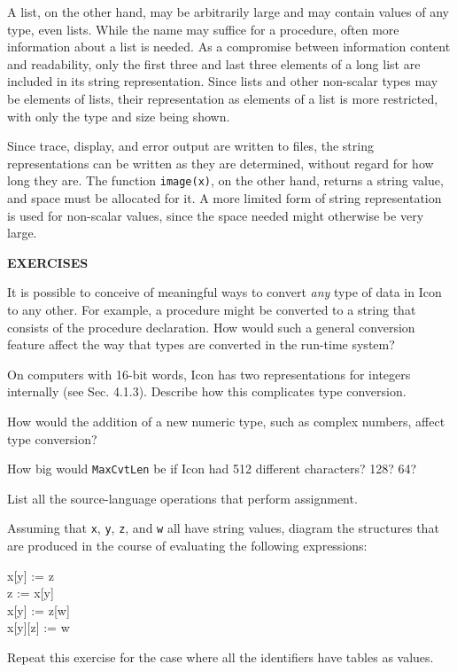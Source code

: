 A list, on the other hand, may be arbitrarily large and may contain
values of any type, even lists. While the name may suffice for a
procedure, often more information about a list is needed. As a
compromise between information content and readability, only the first
three and last three elements of a long list are included in its
string representation.  Since lists and other non-scalar types may be
elements of lists, their representation as elements of a list is more
restricted, with only the type and size being shown.

Since trace, display, and error output are written to files, the
string representations can be written as they are determined, without
regard for how long they are. The function \texttt{image(x)}, on the
other hand, returns a string value, and space must be allocated for
it. A more limited form of string representation is used for
non-scalar values, since the space needed might otherwise be very
large.

\bigskip

\noindent\textbf{EXERCISES}

It is possible to conceive of meaningful ways to convert
\textit{any} type of data in Icon to any other. For example, a
procedure might be converted to a string that consists of the
procedure declaration. How would such a general conversion feature
affect the way that types are converted in the run-time system?

On computers with 16-bit words, Icon has two
representations for integers internally (see Sec. 4.1.3). Describe how
this complicates type conversion.

How would the addition of a new numeric type,
such as complex numbers, affect type conversion?

How big would \texttt{MaxCvtLen} be if Icon had 512
different characters?  128? 64?

List all the source-language operations that
perform assignment.

Assuming that \texttt{x}, \texttt{y}, \texttt{z},
and \texttt{w} all have string values, diagram the structures that are
produced in the course of evaluating the following expressions:
\begin{iconcode}
x[y] := z\\
z := x[y]\\
x[y] := z[w]\\
x[y][z] := w
\end{iconcode}
Repeat this exercise for the case where all the identifiers have tables as values.

